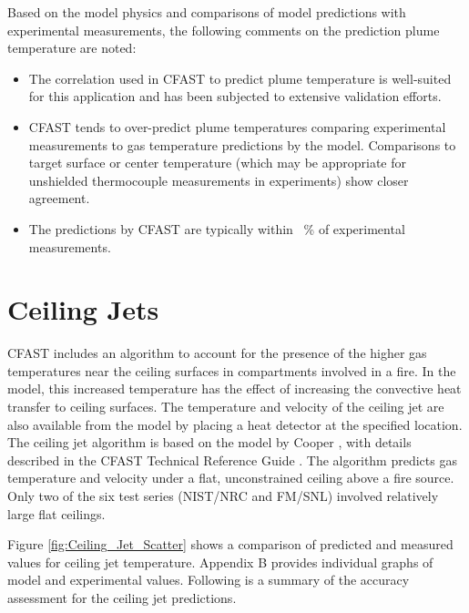 Based on the model physics and comparisons of model predictions with experimental measurements, the following comments on the prediction plume temperature are noted:

\begin{itemize}
\item The correlation used in CFAST to predict plume temperature is well-suited for this application and has been subjected to extensive validation efforts.
\item CFAST tends to over-predict plume temperatures comparing experimental measurements to gas temperature predictions by the model.  Comparisons to target surface or center temperature (which may be appropriate for unshielded thermocouple measurements in experiments) show closer agreement.
\item The predictions by CFAST are typically within \Plumeavg~\% of experimental measurements.
\end{itemize}

\section{Ceiling Jets}

CFAST includes an algorithm to account for the presence of the higher gas temperatures near the ceiling surfaces in compartments involved in a fire.  In the model, this increased temperature has the effect of increasing the convective heat transfer to ceiling surfaces.  The temperature and velocity of the ceiling jet are also available from the model by placing a heat detector at the specified location.  The ceiling jet algorithm is based on the model by Cooper \cite{Cooper:1991}, with details described in the CFAST Technical Reference Guide \cite{CFAST_Tech_Guide_6}.  The algorithm predicts gas temperature and velocity under a flat, unconstrained ceiling above a fire source.  Only two of the six test series (NIST/NRC and FM/SNL) involved relatively large flat ceilings.  

Figure \ref{fig:Ceiling_Jet_Scatter} shows a comparison of predicted and measured values for ceiling jet temperature. Appendix B provides individual graphs of model and experimental values. Following is a summary of the accuracy assessment for the ceiling jet predictions.

